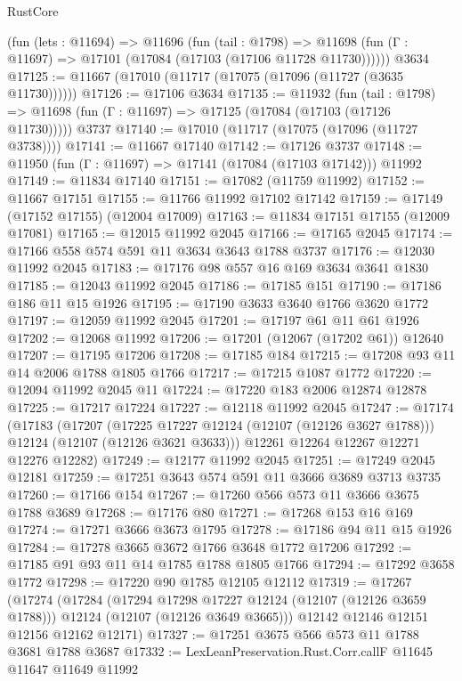 \begin{lexlean}{RustCore}
\begin{coremodule}
    (fun (lets : @11694) =>
    @11696
      (fun (tail : @1798) =>
      @11698 (fun (Γ : @11697) => @17101 (@17084 (@17103 (@17106 @11728 @11730))))))
    @3634
@17125 := @11667 (@17010 (@11717 (@17075 (@17096 (@11727 (@3635 @11730))))))
@17126 := @17106 @3634
@17135 := @11932
    (fun (tail : @1798) => @11698 (fun (Γ : @11697) => @17125 (@17084 (@17103 (@17126 @11730)))))
    @3737
@17140 := @17010 (@11717 (@17075 (@17096 (@11727 @3738))))
@17141 := @11667 @17140
@17142 := @17126 @3737
@17148 := @11950 (fun (Γ : @11697) => @17141 (@17084 (@17103 @17142))) @11992
@17149 := @11834 @17140
@17151 := @17082 (@11759 @11992)
@17152 := @11667 @17151
@17155 := @11766 @11992 @17102 @17142
@17159 := @17149 (@17152 @17155) (@12004 @17009)
@17163 := @11834 @17151 @17155 (@12009 @17081)
@17165 := @12015 @11992 @2045
@17166 := @17165 @2045
@17174 := @17166 @558 @574 @591 @11 @3634 @3643 @1788 @3737
@17176 := @12030 @11992 @2045
@17183 := @17176 @98 @557 @16 @169 @3634 @3641 @1830
@17185 := @12043 @11992 @2045
@17186 := @17185 @151
@17190 := @17186 @186 @11 @15 @1926
@17195 := @17190 @3633 @3640 @1766 @3620 @1772
@17197 := @12059 @11992 @2045
@17201 := @17197 @61 @11 @61 @1926
@17202 := @12068 @11992
@17206 := @17201 (@12067 (@17202 @61)) @12640
@17207 := @17195 @17206
@17208 := @17185 @184
@17215 := @17208 @93 @11 @14 @2006 @1788 @1805 @1766
@17217 := @17215 @1087 @1772
@17220 := @12094 @11992 @2045 @11
@17224 := @17220 @183 @2006 @12874 @12878
@17225 := @17217 @17224
@17227 := @12118 @11992 @2045
@17247 := @17174
    (@17183
      (@17207
        (@17225 @17227 @12124 (@12107 (@12126 @3627 @1788)))
        @12124
        (@12107 (@12126 @3621 @3633)))
      @12261
      @12264
      @12267
      @12271
      @12276
      @12282)
@17249 := @12177 @11992 @2045
@17251 := @17249 @2045 @12181
@17259 := @17251 @3643 @574 @591 @11 @3666 @3689 @3713 @3735
@17260 := @17166 @154
@17267 := @17260 @566 @573 @11 @3666 @3675 @1788 @3689
@17268 := @17176 @80
@17271 := @17268 @153 @16 @169
@17274 := @17271 @3666 @3673 @1795
@17278 := @17186 @94 @11 @15 @1926
@17284 := @17278 @3665 @3672 @1766 @3648 @1772 @17206
@17292 := @17185 @91 @93 @11 @14 @1785 @1788 @1805 @1766
@17294 := @17292 @3658 @1772
@17298 := @17220 @90 @1785 @12105 @12112
@17319 := @17267
    (@17274
      (@17284
        (@17294 @17298 @17227 @12124 (@12107 (@12126 @3659 @1788)))
        @12124
        (@12107 (@12126 @3649 @3665)))
      @12142
      @12146
      @12151
      @12156
      @12162
      @12171)
@17327 := @17251 @3675 @566 @573 @11 @1788 @3681 @1788 @3687
@17332 := LexLeanPreservation.Rust.Corr.callF @11645 @11647 @11649 @11992

\end{coremodule}
\end{lexlean}

